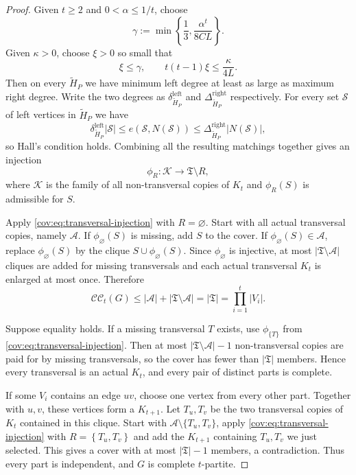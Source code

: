\documentclass[11pt]{article}
\numberwithin{equation}{section}
\theoremstyle{remark}
\newcommand{\CC}{\mathcal{CC}}
\begin{document}
\begin{proof}
Given \(t\ge 2\) and \(0<\alpha\le 1/t\), choose
\begin{equation*}
\gamma:=\min\left\{\frac13,\frac{\alpha^t}{8CL}\right\}.
\end{equation*}
Given \(\kappa>0\), choose \(\xi>0\) so small that
\begin{equation*}
\xi\le\gamma,
\qquad
t(t-1)\xi\le\frac{\kappa}{4L}.
\end{equation*}
Then on every \(\widetilde{H}_P\) we have minimum left degree at least as large as maximum right degree.
Write the two degrees as \(\delta_{\widetilde{H}_P}^{\mathrm{left}}\) and \(\Delta_{\widetilde{H}_P}^{\mathrm{right}}\) respectively.
For every set \(\mathcal S\) of left vertices in \(\widetilde{H}_P\) we have
\begin{equation*}
\delta_{\widetilde{H}_P}^{\mathrm{left}}|\mathcal S|
 \le e(\mathcal S,N(\mathcal S))
 \le \Delta_{\widetilde{H}_P}^{\mathrm{right}}|N(\mathcal S)|,
\end{equation*}
so Hall's condition holds. Combining all the resulting matchings together gives an injection
\begin{equation}\label{cov:eq:transversal-injection}
\phi_R:\mathcal K\longrightarrow\mathfrak T\setminus R,
\end{equation}
where \(\mathcal K\) is the family of all non-transversal copies of \(K_t\) and \(\phi_R(S)\) is admissible for \(S\).

Apply \eqref{cov:eq:transversal-injection} with \(R=\varnothing\).
Start with all actual transversal copies, namely \(\mathcal A\). If \(\phi_\varnothing(S)\) is missing,
add \(S\) to the cover. If \(\phi_\varnothing(S)\in\mathcal A\), replace \(\phi_\varnothing(S)\) by
the clique \(S\cup\phi_\varnothing(S)\). Since \(\phi_\varnothing\) is injective,
at most \(|\mathfrak T\setminus\mathcal A|\) cliques are added for missing transversals and
each actual transversal \(K_t\) is enlarged at most once. Therefore
\begin{equation*}
\CC_t(G)\le |\mathcal A|+|\mathfrak T\setminus\mathcal A|
 =|\mathfrak T|=\prod_{i=1}^t|V_i|.
\end{equation*}

Suppose equality holds. If a missing transversal \(T\) exists, use \(\phi_{\{T\}}\)
from \eqref{cov:eq:transversal-injection}. Then at most \(|\mathfrak T\setminus\mathcal A|-1\)
non-transversal copies are paid for by missing transversals, so the cover has fewer than \(|\mathfrak T|\) members.
Hence every transversal is an actual \(K_t\), and every pair of distinct parts is complete.

If some \(V_i\) contains an edge \(uv\), choose one vertex from every other part. Together with \(u,v\),
these vertices form a \(K_{t+1}\). Let \(T_u,T_v\) be the two transversal copies of \(K_t\) contained in this clique.
Start with \(\mathcal A\setminus\{T_u,T_v\}\), apply \eqref{cov:eq:transversal-injection} with
\(R=\left\{T_u,T_v\right\}\) and add the \(K_{t+1}\) containing \(T_u,T_v\) we just selected.
This gives a cover with at most \(|\mathfrak T|-1\) members, a contradiction.
Thus every part is independent, and \(G\) is complete \(t\)-partite.
\end{proof}
\end{document}
